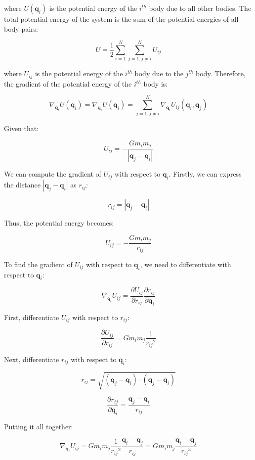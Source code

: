 \documentclass{article}
\begin{document}
where \(U(\mathbf{q}_i)\) is the potential energy of the \(i^{th}\) body due to all other bodies. The total potential energy of the system is the sum of the potential energies of all body pairs:

\[
	U = \frac{1}{2} \sum_{i=1}^{N} \sum_{j=1, j\neq i}^{N} U_{ij}
\]

where \(U_{ij}\) is the potential energy of the \(i^{th}\) body due to the \(j^{th}\) body. Therefore, the gradient of the potential energy of the \(i^{th}\) body is:

\[
	\nabla_{\mathbf{q}_i} U(\mathbf{q}_i) = 
		\nabla_{\mathbf{q}_i} U(\mathbf{q}_i) = \sum_{j=1, j\neq i}^{N} \nabla_{\mathbf{q}_i} U_{ij}(\mathbf{q}_i, \mathbf{q}_j)
\]
		
Given that:
		
\[
	U_{ij} = -\frac{G m_i m_j}{|\mathbf{q}_j - \mathbf{q}_i|}
\]
		
We can compute the gradient of \(U_{ij}\) with respect to \(\mathbf{q}_i\). Firstly, we can express the distance \(|\mathbf{q}_j - \mathbf{q}_i|\) as \(r_{ij}\):

\[ 
	r_{ij} = |\mathbf{q}_j - \mathbf{q}_i| 
\]

Thus, the potential energy becomes:

\[ 
	U_{ij} = -\frac{G m_i m_j}{r_{ij}} 
\]

To find the gradient of \(U_{ij}\) with respect to \(\mathbf{q}_i\), we need to differentiate with respect to \(\mathbf{q}_i\):

\[ 
	\nabla_{\mathbf{q}_i} U_{ij} = \frac{\partial U_{ij}}{\partial r_{ij}} \frac{\partial r_{ij}}{\partial \mathbf{q}_i} 
\]

First, differentiate \(U_{ij}\) with respect to \(r_{ij}\):

\[ 
	\frac{\partial U_{ij}}{\partial r_{ij}} = G m_i m_j \frac{1}{{r_{ij}}^2} 
\]

Next, differentiate \(r_{ij}\) with respect to \(\mathbf{q}_i\):

\[ 
	r_{ij} = \sqrt{(\mathbf{q}_j - \mathbf{q}_i) \cdot (\mathbf{q}_j - \mathbf{q}_i)} 
\]

\[ 
	\frac{\partial r_{ij}}{\partial \mathbf{q}_i} = \frac{\mathbf{q}_j - \mathbf{q}_i}{{r_{ij}}} 
\]

Putting it all together:

\[ 
	\nabla_{\mathbf{q}_i} U_{ij} = G m_i m_j \frac{1}{{r_{ij}}^2} \frac{\mathbf{q}_i - \mathbf{q}_j}{{r_{ij}}} = G m_i m_j \frac{\mathbf{q}_i - \mathbf{q}_j}{{r_{ij}}^3} 
\]
\end{document}
